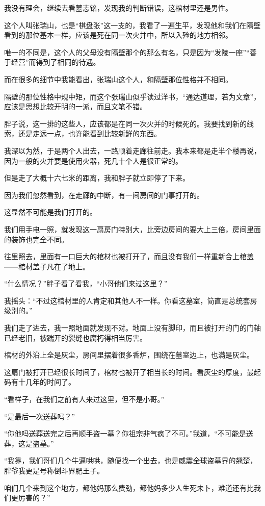 我没有理会，继续去看墓志铭，发现我的判断错误，这棺材里还是男性。

这个人叫张瑞山，也是“棋盘张”这一支的，我看了一遍生平，发现他和我们在隔壁看到的那位基本一样，应该是死在同一次火并中，所以入殓的地方相邻。

唯一的不同是，这个人的父母没有隔壁那个的那么有名，只是因为“发陵一座”“善于经营”而得到了相同的待遇。

而在很多的细节中我能看出，张瑞山这个人，和隔壁那位性格并不相同。

隔壁的那位性格中规中矩，而这个张瑞山似乎读过洋书，“通达道理，若为文章”，应该是思想比较开明的一派，而且文笔不错。

胖子说，这一排的这些人，应该都是在同一次火并的时候死的。我要找到新的线索，还是走远一点，也许能看到比较新鲜的东西。

我深以为然，于是两个人出去，一路顺着走廊往前走。我本来都是走半个楼再说，因为一般的火并要是使用火器，死几十个人是很正常的。

但是走了大概十六七米的距离，我和胖子就立即停了下来。

因为我们忽然看到，在走廊的中断，有一间房间的门事打开的。

这显然不可能是我们打开的。

我们用手电一照，就发现这一扇房门特别大，比旁边房间的要大上三倍，房间里面的装饰也完全不同。

往里照去，里面有一口巨大的棺材也被打开了，而且没有我们一样重新合上棺盖——棺材盖子凡在了地上。

“什么情况？”胖子看了看我，“小哥他们来过这里？”

我摇头：“不过这棺材里的人肯定和其他人不一样。你看这墓室，简直是总统套房级别的。”

我们走了进去，我一照地面就发现不对。地面上没有脚印，而且被打开的门的门轴已经老旧，被踹开的裂缝也腐朽得相当厉害。

棺材的外沿上全是灰尘，房间里摆着很多香炉，围绕在墓室边上，也满是灰尘。

这扇门被打开已经很长时间了，棺材也被开了相当长的时间。看灰尘的厚度，最起码有十几年的时间了。

“看样子，在我们之前有人来过这里，但不是小哥。”

“是最后一次送葬吗？”

“你他吗送葬送完之后再顺手盗一墓？你祖宗非气疯了不可。”我道，“不可能是送葬，这是盗墓。”

“我靠，我们哥们几个牛逼哄哄，随便找一个出去，也是威震全球盗墓界的翘楚，胖爷我更是号称倒斗界肥王子。

咱们几个来到这个地方，都他妈那么费劲，都他妈多少人生死未卜，难道还有比我们更厉害的？”


